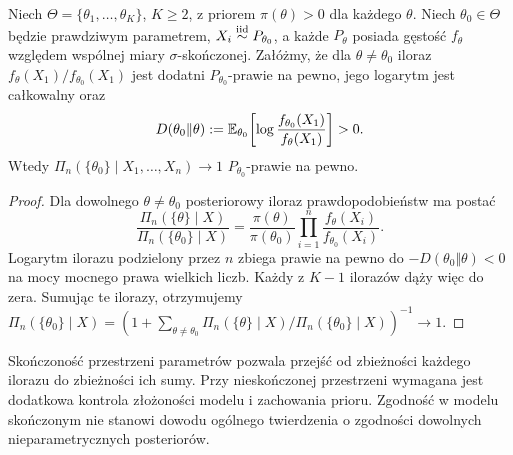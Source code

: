 \begin{twierdzenie}
\label{thm:finite-bayes-consistency}
Niech $\Theta=\{\theta_1,\ldots,\theta_K\}$,
$K\ge2$, z priorem $\pi(\theta)>0$ dla każdego $\theta$.
Niech $\theta_0\in\Theta$ będzie prawdziwym parametrem,
$X_i\mathrel{\overset{\mathrm{iid}}\sim} P_{\theta_0}$, a każde $P_\theta$ posiada
gęstość $f_\theta$ względem wspólnej miary $\sigma$-skończonej.
Załóżmy, że dla $\theta\ne\theta_0$ iloraz
$f_\theta(X_1)/f_{\theta_0}(X_1)$ jest dodatni
$P_{\theta_0}$-prawie na pewno, jego logarytm jest
całkowalny oraz
\[
 D(\theta_0\Vert\theta)
 :=\mathbb E_{\theta_0}\!\left[
  \log\frac{f_{\theta_0}(X_1)}{f_\theta(X_1)}\right]>0.
\]
Wtedy $\Pi_n(\{\theta_0\}\mid X_1,\ldots,X_n)\to1$
$P_{\theta_0}$-prawie na pewno.
\end{twierdzenie}
\begin{proof}
Dla dowolnego $\theta\ne\theta_0$ posteriorowy iloraz
prawdopodobieństw ma postać
\[
 \frac{\Pi_n(\{\theta\}\mid X)}{\Pi_n(\{\theta_0\}\mid X)}
 =\frac{\pi(\theta)}{\pi(\theta_0)}
 \prod_{i=1}^n\frac{f_\theta(X_i)}{f_{\theta_0}(X_i)}.
\]
Logarytm ilorazu podzielony przez $n$ zbiega
prawie na pewno do $-D(\theta_0\Vert\theta)<0$
na mocy mocnego prawa wielkich liczb. Każdy z $K-1$
ilorazów dąży więc do zera. Sumując te ilorazy,
otrzymujemy
$\Pi_n(\{\theta_0\}\mid X)
 =(1+\sum_{\theta\ne\theta_0}\Pi_n(\{\theta\}\mid X)/
 \Pi_n(\{\theta_0\}\mid X))^{-1}\to1$.
\end{proof}

\begin{uwaga}
Skończoność przestrzeni parametrów pozwala przejść od
zbieżności każdego ilorazu do zbieżności ich sumy.
Przy nieskończonej przestrzeni wymagana jest dodatkowa
kontrola złożoności modelu i zachowania prioru. Zgodność
w modelu skończonym nie stanowi dowodu ogólnego twierdzenia
o zgodności dowolnych nieparametrycznych posteriorów.
\end{uwaga}

